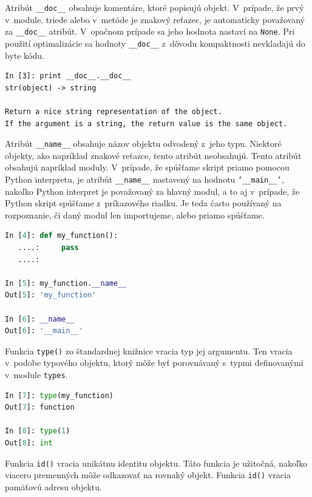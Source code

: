 \documentclass[11pt,oneside,final]{fithesis2}
\begin{document}
\begin{list}{•}{}
		\item 
			Atribút \texttt{\_\_doc\_\_} obsahuje komentáre, ktoré popisujú objekt. V~prípade, že prvý v~module, triede alebo v~metóde je znakový reťazec, je automaticky považovaný za \texttt{\_\_doc\_\_} atribút. V~opačnom prípade sa jeho hodnota nastaví na \texttt{None}. Pri použití optimalizácie sa hodnoty \texttt{\_\_doc\_\_} z~dôvodu kompaktnosti nevkladajú do byte kódu.
			
\begin{lstlisting}
In [3]: print __doc__.__doc__
str(object) -> string

Return a nice string representation of the object.
If the argument is a string, the return value is the same object.
\end{lstlisting}

		\item 
			Atribút \texttt{\_\_name\_\_} obsahuje názov objektu odvodený z~jeho typu. Niektoré objekty, ako napríklad znakové reťazce, tento atribút neobsahujú. Tento atribút obsahujú napríklad moduly. V~prípade, že spúšťame skript priamo pomocou Python interpretu, je atribút \texttt{\_\_name\_\_} nastavený na hodnotu \texttt{'\_\_main\_\_'}, nakoľko Python interpret je považovaný za hlavný modul, a to aj v~prípade, že Python skript spúšťame z~príkazového riadku. Je teda často používaný na rozpoznanie, či daný modul len importujeme, alebo priamo spúšťame.
	
\begin{lstlisting}[language=python]		
In [4]: def my_function():
   ....:     pass
   ....: 

In [5]: my_function.__name__
Out[5]: 'my_function'

In [6]: __name__
Out[6]: '__main__'
\end{lstlisting}

		\item 
		
		Funkcia \texttt{type()} zo štandardnej knižnice vracia typ jej argumentu. Ten vracia v~podobe typového objektu, ktorý môže byť porovnávaný s~typmi definovanými v~module \texttt{types}.

\begin{lstlisting}[language=python]	
In [7]: type(my_function)
Out[7]: function

In [8]: type(1)
Out[8]: int
\end{lstlisting}


		\item 
		
		Funkcia \texttt{id()} vracia unikátnu identitu objektu. Táto funkcia je užitočná, nakoľko viacero premenných môže odkazovať na rovnaký objekt. Funkcia \texttt{id()} vracia pamäťovú adresu objektu.


\end{list}
\end{document}
